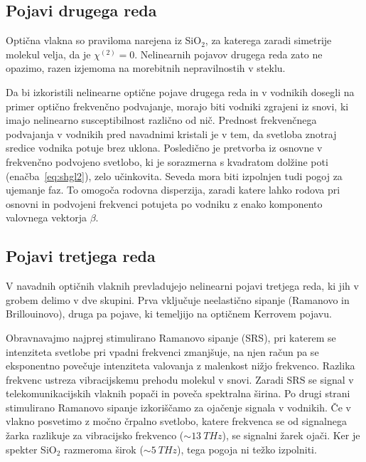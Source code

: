 \subsection*{Pojavi drugega reda}
Optična vlakna so praviloma narejena iz SiO$_2$, 
za katerega zaradi simetrije molekul velja, da je $\chi^{(2)}=0$. 
Nelinearnih pojavov drugega reda zato ne opazimo, razen izjemoma na morebitnih 
nepravilnostih v steklu.

Da bi izkoristili nelinearne optične pojave
drugega reda in v vodnikih dosegli na primer optično frekvenčno podvajanje,
morajo biti vodniki zgrajeni iz snovi, ki imajo nelinearno susceptibilnost 
različno od nič. Prednost frekvenčnega podvajanja v vodnikih pred navadnimi 
kristali je v tem, 
da svetloba znotraj sredice vodnika potuje brez uklona. Posledično je
pretvorba iz osnovne v frekvenčno podvojeno svetlobo, ki je sorazmerna s kvadratom 
dolžine poti (enačba~\ref{eq:shgl2}), zelo učinkovita. Seveda 
mora biti izpolnjen tudi pogoj za ujemanje faz. To 
omogoča rodovna disperzija, zaradi 
katere lahko rodova pri osnovni in podvojeni frekvenci potujeta po vodniku
z enako komponento valovnega vektorja $\beta$.

\subsection*{Pojavi tretjega reda}
V navadnih optičnih vlaknih  
prevladujejo nelinearni pojavi tretjega reda, ki jih v grobem delimo v dve skupini. Prva vključuje
neelastično sipanje (Ramanovo in Brillouinovo), druga pa pojave, ki 
temeljijo na optičnem Kerrovem pojavu.

Obravnavajmo najprej stimulirano Ramanovo sipanje 
(SRS), pri katerem se intenziteta 
svetlobe pri vpadni frekvenci zmanjšuje, na njen račun pa se eksponentno povečuje 
intenziteta valovanja z malenkost nižjo frekvenco. Razlika frekvenc ustreza
vibracijskemu prehodu molekul v snovi. Zaradi SRS se signal v telekomunikacijskih vlaknih 
popači in poveča spektralna širina. Po drugi strani stimulirano Ramanovo sipanje 
izkoriščamo za ojačenje signala v vodnikih. Če v vlakno posvetimo z močno črpalno
svetlobo, katere frekvenca se od signalnega žarka razlikuje za vibracijsko frekvenco
($\sim 13~\si{THz}$), se signalni žarek ojači. Ker je spekter SiO$_2$ razmeroma 
širok ($\sim 5~\si{THz}$), tega pogoja ni težko izpolniti. 

